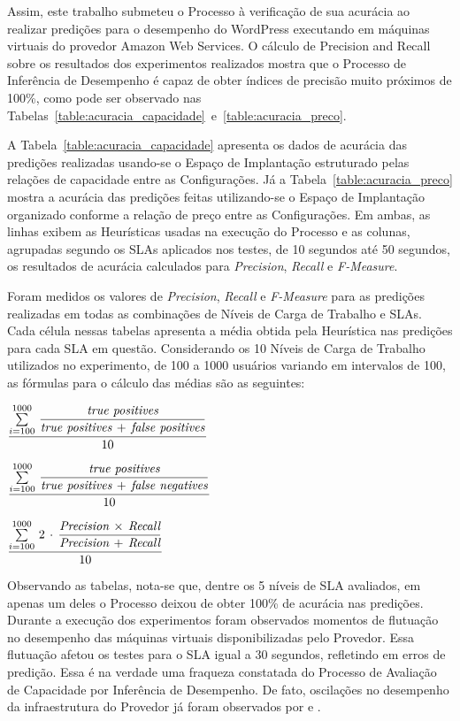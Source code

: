 Assim, este trabalho submeteu o Processo à verificação de sua acurácia ao realizar
predições para o desempenho do WordPress executando em máquinas virtuais do provedor
Amazon Web Services. O cálculo de Precision and Recall~\cite{powers2011evaluation} 
sobre os resultados dos experimentos realizados mostra que o Processo de Inferência 
de Desempenho é capaz de obter índices de precisão muito próximos de 100\%, como 
pode ser observado nas Tabelas~\ref{table:acuracia_capacidade}~e~\ref{table:acuracia_preco}. 

A Tabela~\ref{table:acuracia_capacidade} apresenta os dados de acurácia das 
predições realizadas usando-se o Espaço de Implantação estruturado pelas relações
de capacidade entre as Configurações. Já a Tabela~\ref{table:acuracia_preco} mostra
a acurácia das predições feitas utilizando-se o Espaço de Implantação organizado
conforme a relação de preço entre as Configurações. Em ambas, as linhas exibem 
as Heurísticas usadas na execução do Processo e as colunas, agrupadas segundo
os SLAs aplicados nos testes, de 10 segundos até 50 segundos, os resultados 
de acurácia calculados para \emph{Precision}, \emph{Recall} e \emph{F-Measure}.

Foram medidos os valores de \emph{Precision}, \emph{Recall} e \emph{F-Measure}
para as predições realizadas em todas as combinações de Níveis de Carga de 
Trabalho e SLAs. Cada célula nessas tabelas apresenta a média obtida pela 
Heurística nas predições para cada SLA em questão. Considerando os 10 Níveis
de Carga de Trabalho utilizados no experimento, de 100 a 1000 usuários variando
em intervalos de 100, as fórmulas para o cálculo das médias são as seguintes: 

\begin{description}[leftmargin=!,labelwidth=\widthof{\bfseries F-Measure:}]
  \item[\emph{Precision}:] $\dfrac{\sum\limits_{i=100}^{1000}\,\dfrac{\emph{true positives}}{\emph{true positives}\,+\,\emph{false positives}}}{10}$
  \item[\emph{Recall}:] $\dfrac{\sum\limits_{i=100}^{1000}\,\dfrac{\emph{true positives}}{\emph{true positives}\,+\,\emph{false negatives}}}{10}$
  \item[\emph{F-Measure}:] $\dfrac{\sum\limits_{i=100}^{1000}\,2\,\cdot\,\dfrac{\emph{Precision}\,\times\,\emph{Recall}}{\emph{Precision}\,+\,\emph{Recall}}}{10}$
\end{description}

Observando as tabelas, nota-se que, dentre os 5 níveis de SLA avaliados, em apenas 
um deles o Processo deixou de obter 100\% de acurácia nas predições. Durante a
execução dos experimentos foram observados momentos de flutuação no desempenho
das máquinas virtuais disponibilizadas pelo Provedor. Essa flutuação afetou os
testes para o SLA igual a 30 segundos, refletindo em erros de predição. Essa é
na verdade uma fraqueza constatada do Processo de Avaliação de Capacidade por
Inferência de Desempenho. De fato, oscilações no desempenho da infraestrutura
do Provedor já foram observados por \cite{iosup2011performance} e \cite{cunhaavalia}.

